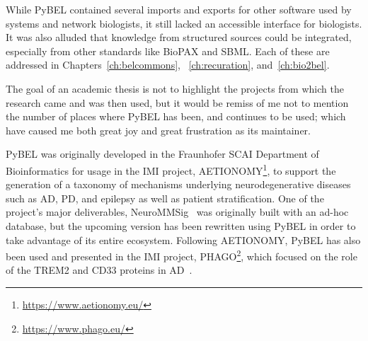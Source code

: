 While PyBEL contained several imports and exports for other software used by systems and network biologists, it still lacked an accessible interface for biologists.
It was also alluded that knowledge from structured sources could be integrated, especially from other standards like \ac{BioPAX} and \ac{SBML}.
Each of these are addressed in Chapters~\ref{ch:belcommons}, ~\ref{ch:recuration}, and~\ref{ch:bio2bel}.

The goal of an academic thesis is not to highlight the projects from which the research came and was then used, but it would be remiss of me not to mention the number of places where PyBEL has been, and continues to be used; which have caused me both great joy and great frustration as its maintainer.

PyBEL was originally developed in the Fraunhofer SCAI Department of Bioinformatics for usage in the \ac{IMI} project, AETIONOMY\footnote{\url{https://www.aetionomy.eu/}}, to support the generation of a taxonomy of mechanisms underlying neurodegenerative diseases such as \ac{AD}, \ac{PD}, and epilepsy as well as patient stratification.
One of the project's major deliverables, NeuroMMSig~\cite{Domingo-Fernandez2017} was originally built with an ad-hoc database, but the upcoming version has been rewritten using PyBEL in order to take advantage of its entire ecosystem.
Following AETIONOMY, PyBEL has also been used and presented in the \ac{IMI} project, PHAGO\footnote{\url{https://www.phago.eu/}}, which focused on the role of the TREM2 and CD33 proteins in \ac{AD}~\cite{Ebeling2017}.

